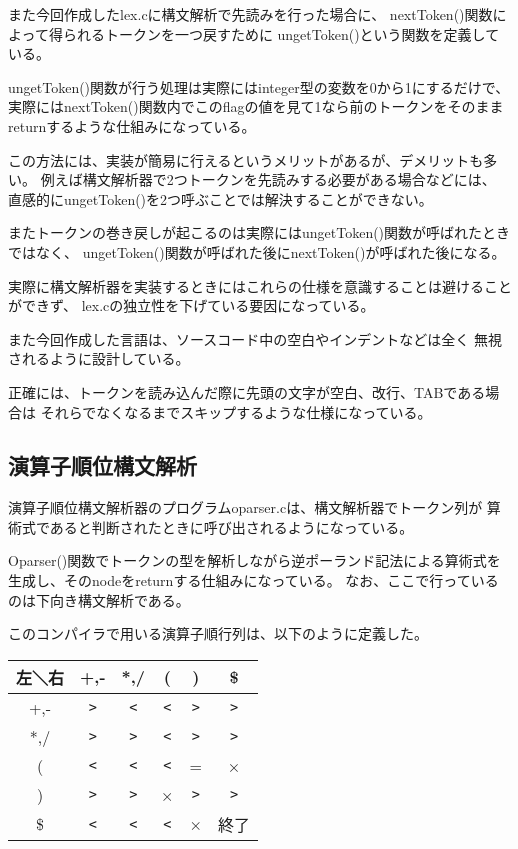 \documentclass[11pt,a4j]{jarticle}
\begin{document}
また今回作成したlex.cに構文解析で先読みを行った場合に、
nextToken()関数によって得られるトークンを一つ戻すために
ungetToken()という関数を定義している。

ungetToken()関数が行う処理は実際にはinteger型の変数を0から1にするだけで、
実際にはnextToken()関数内でこのflagの値を見て1なら前のトークンをそのまま
returnするような仕組みになっている。

この方法には、実装が簡易に行えるというメリットがあるが、デメリットも多い。
例えば構文解析器で2つトークンを先読みする必要がある場合などには、
直感的にungetToken()を2つ呼ぶことでは解決することができない。

またトークンの巻き戻しが起こるのは実際にはungetToken()関数が呼ばれたときではなく、
ungetToken()関数が呼ばれた後にnextToken()が呼ばれた後になる。

実際に構文解析器を実装するときにはこれらの仕様を意識することは避けることができず、
lex.cの独立性を下げている要因になっている。


\vspace{0.2in}

また今回作成した言語は、ソースコード中の空白やインデントなどは全く
無視されるように設計している。

正確には、トークンを読み込んだ際に先頭の文字が空白、改行、TABである場合は
それらでなくなるまでスキップするような仕様になっている。



\subsection{演算子順位構文解析}


演算子順位構文解析器のプログラムoparser.cは、構文解析器でトークン列が
算術式であると判断されたときに呼び出されるようになっている。

Oparser()関数でトークンの型を解析しながら逆ポーランド記法による算術式を
生成し、そのnodeをreturnする仕組みになっている。
なお、ここで行っているのは下向き構文解析である。


このコンパイラで用いる演算子順行列は、以下のように定義した。

\begin{table}[h]
\centering
\begin{tabular}{|c|c|c|c|c|c|}\hline
左＼右 & +,- & *,/ & ( & ) & \$\\ \hline
+,- & \verb|>| & \verb|<| & \verb|<| & \verb|>| & \verb|>| \\ \hline
*,/ & \verb|>| & \verb|>| & \verb|<| & \verb|>| & \verb|>| \\ \hline
( & \verb|<| & \verb|<| & \verb|<| & = & × \\ \hline
) & \verb|>| & \verb|>| & × & \verb|>| & \verb|>| \\ \hline
\$ & \verb|<| & \verb|<| & \verb|<| & × & 終了 \\ \hline
\end{tabular}
\end{table}
\end{document}
